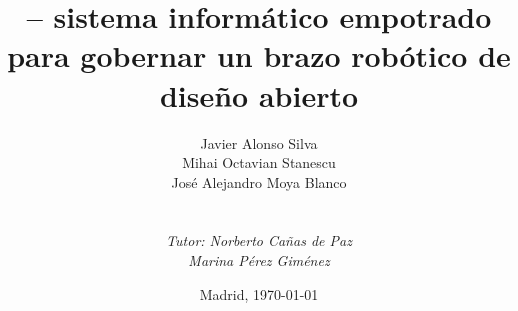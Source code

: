 
\def\Company{Consultancy}
\def\Institute{\textit{Universidad Politécnica de Madrid}\\ \textit{Escuela Técnica Superior de Ingeniería de Sistemas Informáticos}}
\def\Course{\textit{Grado en Ingeniería de Computadores}}
\def\Module{\textit{Trabajo de Fin de Grado}}
\def\Docent{\textit{Tutor: Norberto Cañas de Paz} \\ \textit{Marina Pérez Giménez}}
\def\Assistant{}


\def\Subtitle{\pArm{} -- sistema informático empotrado para gobernar un brazo robótico de diseño abierto}
\def\Authors{Javier Alonso Silva \\ Mihai Octavian Stanescu \\ José Alejandro Moya Blanco } 
\def\Shortname{J. Alonso, M. Stanescu, A. Moya}


\title{\Subtitle}
\author{\Authors \\ \\ \\ \Docent}
\date{Madrid, \today{}}

